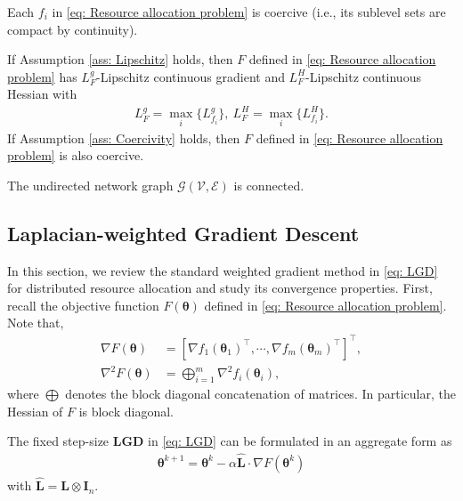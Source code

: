 \documentclass{siamart251216}
\begin{document}
\begin{assumption}[Coercivity]
\label{ass: Coercivity}
    Each $f_{i}$ in \eqref{eq: Resource allocation problem} is coercive (i.e., its sublevel sets are compact by continuity).
\end{assumption}

\begin{remark}
    If Assumption \ref{ass: Lipschitz} holds, then $F$ defined in \eqref{eq: Resource allocation problem} has $L_{F}^{g}$-Lipschitz continuous gradient and $L_{F}^{H}$-Lipschitz continuous Hessian with
    \begin{gather}
    \label{eq: Lipschitz continuous for F}
        L_{F}^{g} = \max_{i} \{L_{f_{i}}^{g}\},~L_{F}^{H} = \max_{i} \{L_{f_{i}}^{H}\}.
    \end{gather}
    If Assumption \ref{ass: Coercivity} holds, then $F$ defined in \eqref{eq: Resource allocation problem} is also coercive.
\end{remark}

\begin{assumption}
\label{ass: Network}
    The undirected network graph $\mathcal{G}(\mathcal{V},\mathcal{E})$ is connected.
\end{assumption}

\subsection{Laplacian-weighted Gradient Descent}
In this section, we review the standard weighted gradient method in \eqref{eq: LGD} for distributed resource allocation and study its convergence properties. First, recall the objective function $F(\boldsymbol{\theta})$ defined in \eqref{eq: Resource allocation problem}. Note that,
\begin{align*}
    \nabla F(\boldsymbol{\theta})
    &= [\nabla f_{1}(\boldsymbol{\theta}_{1})^{\top},\cdots, \nabla f_{m}(\boldsymbol{\theta}_{m})^{\top}]^{\top},\\
    \nabla^{2} F(\boldsymbol{\theta})
    &= \bigoplus_{i=1}^{m} \nabla^{2} f_{i}(\boldsymbol{\theta}_{i}),
\end{align*}
where $\bigoplus$ denotes the block diagonal concatenation of matrices. In particular, the Hessian of $F$ is block diagonal.

The fixed step-size \textbf{LGD} in \eqref{eq: LGD} can be formulated in an aggregate form as
\begin{gather}
\label{eq: LGD aggregate form}
    \boldsymbol{\theta}^{k+1} = \boldsymbol{\theta}^{k} - \alpha \hat{\mathbf{L}} \cdot \nabla  F(\boldsymbol{\theta}^{k})
\end{gather}
with $\hat{\mathbf{L}} = \mathbf{L}\otimes \mathbf{I}_{n}$.
\end{document}
